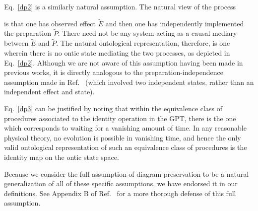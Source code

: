 \documentclass[10pt,twocolumn,aps,groupedaddress,nofootinbib]{revtex4}
\begin{document}
Eq.~\eqref{dp2} is a similarly natural assumption.
The natural view of the process
\beq
{}
\eeq
is that one has observed effect $\widetilde{E}$ and then one has independently implemented the preparation $\widetilde{P}$. There need not be any system acting as a causal mediary between $\widetilde{E}$ and $\widetilde{P}$.
  The natural ontological representation, therefore,
is one wherein
there is no ontic state mediating the two processes,
as depicted in Eq.~\eqref{dp2}.  Although we are not aware of this assumption having been made in previous works, it is directly analogous to the
preparation-independence assumption made in Ref.~\cite{Pusey2012} (which involved two independent states, rather than an independent effect and state).

Eq.~\eqref{dp3} can be justified by noting that within the equivalence class of procedures associated to the identity operation in the GPT, there is the one which corresponds to waiting for a vanishing amount of time.
In any reasonable physical theory, no evolution is possible in vanishing time, and hence the only valid ontological representation of such an equivalence class of procedures is the identity map on the ontic state space.

Because we consider the full assumption of diagram preservation to be a natural generalization of all of these specific assumptions, we have endorsed it in our definitions.
 See Appendix B of Ref.~\cite{schmid2020unscrambling} for a more thorough defense of this full assumption.
\end{document}
